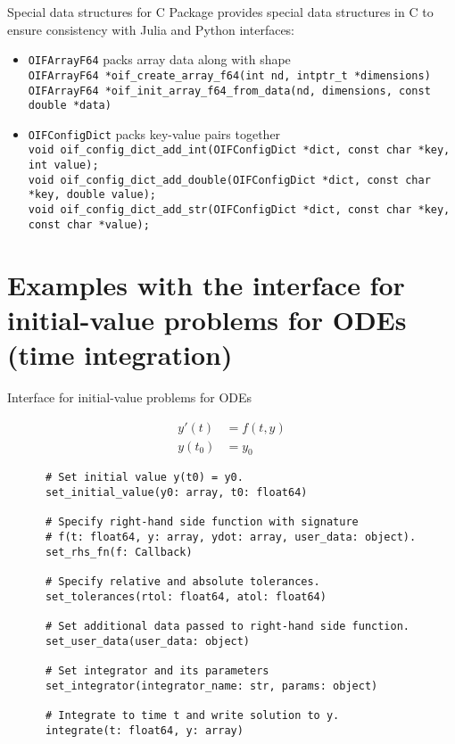 \documentclass[10pt, aspectratio=169, progressbar=frametitle]{beamer}
\begin{document}
\begin{frame}{Special data structures for C}
  \small Package provides special data structures in C to ensure consistency
  with Julia and Python interfaces:
  \begin{itemize}
    \item \texttt{OIFArrayF64} packs array data along with shape\\
          \texttt{OIFArrayF64 *oif\_create\_array\_f64(int nd, intptr\_t *dimensions)}\\
          \texttt{OIFArrayF64 *oif\_init\_array\_f64\_from\_data(nd, dimensions, const double *data)
}
      \item<2-> \texttt{OIFConfigDict} packs key-value pairs together\\
          \texttt{void oif\_config\_dict\_add\_int(OIFConfigDict *dict, const char *key, int value);}\\
          \texttt{void oif\_config\_dict\_add\_double(OIFConfigDict *dict, const char *key, double value);}\\
          \texttt{void oif\_config\_dict\_add\_str(OIFConfigDict *dict, const char *key, const char *value);}
  \end{itemize}
\end{frame}

\section{Examples with the interface for initial-value problems for ODEs (time integration)}

\begin{frame}[fragile]{Interface for initial-value problems for ODEs}
  \begin{minipage}{\dimexpr0.22\textwidth-2\tabcolsep}
    \begin{align*}
      y'(t)  & = f(t, y) \\
      y(t_0) & = y_0
    \end{align*}
  \end{minipage}
  \begin{minipage}{\dimexpr0.73\textwidth-2\tabcolsep}
    {\footnotesize
    \begin{verbatim}
      # Set initial value y(t0) = y0.
      set_initial_value(y0: array, t0: float64)

      # Specify right-hand side function with signature
      # f(t: float64, y: array, ydot: array, user_data: object).
      set_rhs_fn(f: Callback)

      # Specify relative and absolute tolerances.
      set_tolerances(rtol: float64, atol: float64)

      # Set additional data passed to right-hand side function.
      set_user_data(user_data: object)

      # Set integrator and its parameters
      set_integrator(integrator_name: str, params: object)

      # Integrate to time t and write solution to y.
      integrate(t: float64, y: array)
    \end{verbatim}
    }
  \end{minipage}
\end{frame}
\end{document}
